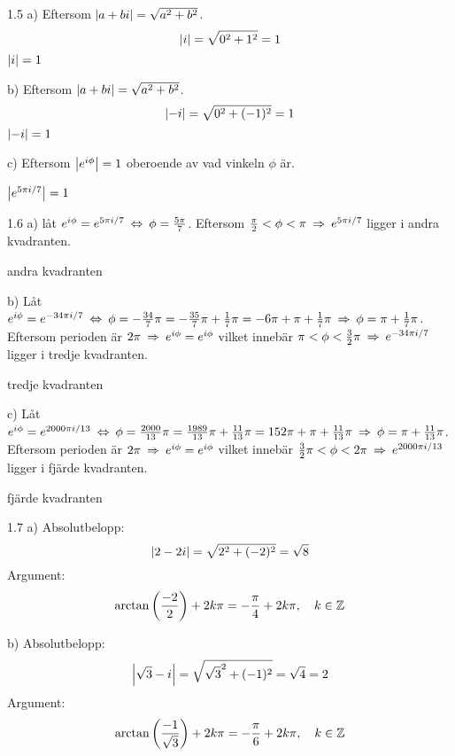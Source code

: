 \begin{task}{1.5 a)}
	Eftersom $\left|a+bi\right|=\sqrt{a^2+b^2}$.
	\[\left|i\right|=\sqrt{0^2+1^2}=1\]
	\ans $\left|i\right|=1$
\end{task}

\begin{task}{b)}
	Eftersom $\left|a+bi\right|=\sqrt{a^2+b^2}$.
	\[\left|-i\right|=\sqrt{0^2+(-1)^2}=1\]
	\ans $\left|-i\right|=1$
\end{task}

\begin{task}{c)}
	Eftersom $\left|e^{i\phi}\right|=1$ oberoende av vad vinkeln $\phi$ är.
	
	\ans $\left|e^{5\pi i/7}\right|=1$
\end{task}

\begin{task}{1.6 a)}
	låt $e^{i\phi}=e^{5\pi i/7} \lra \phi=\frac{5\pi}{7}$. Eftersom $\frac{\pi}{2}<\phi<\pi \ra e^{5\pi i/7}$ ligger i andra kvadranten.
	
	\ans andra kvadranten
\end{task}

\begin{task}{b)}
	Låt 
	$e^{i\phi}=e^{-34\pi i/7} \lra 
	\phi=
	-\frac{34}{7}\pi=
	-\frac{35}{7}\pi+\frac{1}{7}\pi=
	-6\pi+\pi+\frac{1}{7}\pi \ra
	\phi=\pi+\frac{1}{7}\pi$.
	Eftersom perioden är $2\pi \ra e^{i\phi} = e^{i\phi}$ vilket innebär $\pi<\phi<\frac{3}{2}\pi \ra e^{-34\pi i/7}$ ligger i tredje kvadranten.
	
	\ans tredje kvadranten
\end{task}

\begin{task}{c)}
	Låt 
	$e^{i\phi}=e^{2000\pi i/13} \lra 
	\phi=
	\frac{2000}{13}\pi=
	\frac{1989}{13}\pi+\frac{11}{13}\pi=
	152\pi+\pi+\frac{11}{13}\pi \ra
	\phi=\pi+\frac{11}{13}\pi$.
	Eftersom perioden är $2\pi \ra e^{i\phi} = e^{i\phi}$ vilket innebär $\frac{3}{2}\pi<\phi<2\pi \ra e^{2000\pi i/13}$ ligger i fjärde kvadranten.
	
	\ans fjärde kvadranten
\end{task}

\begin{task}{1.7 a)}
	Absolutbelopp:
	\[\left|2-2i\right|=\sqrt{2^2+(-2)^2}=\sqrt{8}\]
	Argument:
	\[\arctan\left(\frac{-2}{2}\right)+2k\pi=-\frac{\pi}{4}+2k\pi, \quad k\in\mathbb{Z}\]
\end{task}

\begin{task}{b)}
	Absolutbelopp:
	\[\left|\sqrt{3}-i\right|=\sqrt{\sqrt{3}^2+(-1)^2}=\sqrt{4}=2\]
	Argument:
	\[\arctan\left(\frac{-1}{\sqrt{3}}\right)+2k\pi=-\frac{\pi}{6}+2k\pi, \quad k\in\mathbb{Z}\]
\end{task}

